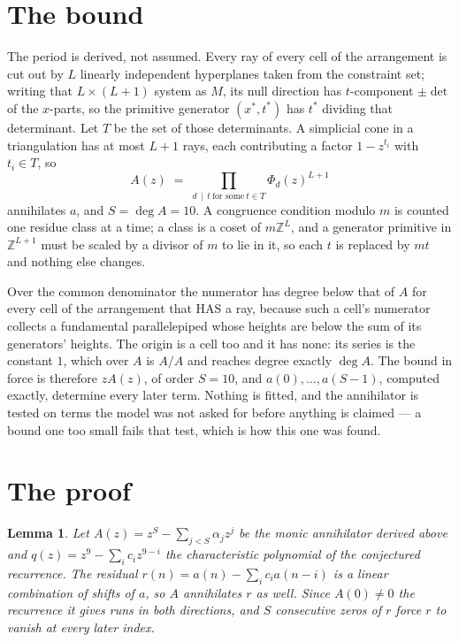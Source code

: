 \documentclass[11pt,a4paper]{article}
\theoremstyle{plain}
\newtheorem{lemma}[theorem]{Lemma}
\theoremstyle{definition}
\begin{document}
\section{The bound}

The period is derived, not assumed. Every ray of every cell of the arrangement is cut out by
$L$ linearly independent hyperplanes taken from the constraint set; writing that $L\times(L+1)$
system as $M$, its null direction has $t$-component $\pm\det$ of the $x$-parts, so the
primitive generator $(x^*,t^*)$ has $t^*$ dividing that determinant. Let $T$ be the set of
those determinants. A simplicial cone in a triangulation has at most $L+1$ rays, each
contributing a factor $1-z^{t_i}$ with $t_i\in T$, so
\[
A(z)\;=\;\prod_{d\,\mid\,t\ \text{for some}\ t\in T}\Phi_d(z)^{L+1}
\]
annihilates $a$, and $S=\deg A=10$. A congruence condition modulo $m$ is counted one residue
class at a time; a class is a coset of $m\mathbb{Z}^L$, and a generator primitive in
$\mathbb{Z}^{L+1}$ must be scaled by a divisor of $m$ to lie in it, so each $t$ is replaced
by $mt$ and nothing else changes.

Over the common denominator the numerator has degree below that of $A$ for every cell of the
arrangement that HAS a ray, because such a cell's numerator collects a fundamental
parallelepiped whose heights are below the sum of its generators' heights. The origin is a cell
too and it has none: its series is the constant $1$, which over $A$ is $A/A$ and reaches degree
exactly $\deg A$. The bound in force is therefore $zA(z)$, of order $S=10$, and
$a(0),\dots,a(S-1)$, computed exactly, determine every later term. Nothing is fitted, and the
annihilator is tested on terms the model was not asked for before anything is claimed --- a
bound one too small fails that test, which is how this one was found.

\section{The proof}

\begin{lemma}\label{lem:crit}
Let $A(z)=z^S-\sum_{j<S}\alpha_jz^{j}$ be the monic annihilator derived above and
$q(z)=z^{9}-\sum_ic_iz^{9-i}$ the characteristic polynomial of the conjectured
recurrence. The residual $r(n)=a(n)-\sum_ic_ia(n-i)$ is a linear combination of shifts of $a$,
so $A$ annihilates $r$ as well. Since $A(0)\ne0$ the recurrence it gives runs in both
directions, and $S$ consecutive zeros of $r$ force $r$ to vanish at every later index.
\end{lemma}
\end{document}
